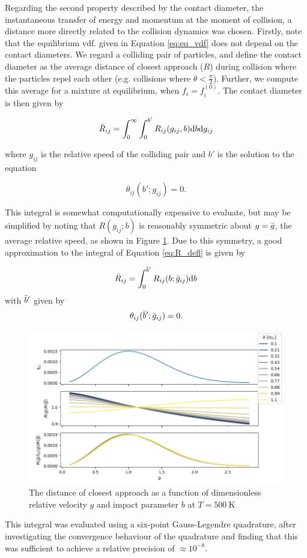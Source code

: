 Regarding the second property described by the contact diameter, the instantaneous transfer of energy and momentum at the moment of collision, a distance more directly related to the collision dynamics was chosen. Firstly, note that the equilibrium vdf. given in Equation \eqref{eq:eq_vdf} does not depend on the contact diameters. We regard a colliding pair of particles, and define the contact diameter as the average distance of closest approach ($R$) during collision where the particles repel each other (e.g. collisions where $\theta < \frac{\pi}{2}$). Further, we compute this average for a mixture at equilibrium, when $f_i = f_i^{(0)}$. The contact diameter is then given by

\begin{equation}
    \Bar{R}_{ij} = \int_{0}^{\infty} \int_0^{b'} R_{ij}(g_{ij}, b) \mathrm{d} b \mathrm{d} g_{ij}
    \label{eq:R_defl}
\end{equation}

where $g_{ij}$ is the relative speed of the colliding pair and $b'$ is the solution to the equation

\begin{equation}
    \theta_{ij}(b'; g_{ij}) = 0.
\end{equation}

This integral is somewhat computationally expensive to evaluate, but may be simplified by noting that $R(g_{ij}; b)$ is reasonably symmetric about $g = \Bar{g}$, the average relative speed, as shown in Figure \ref{fig:symmetry_closest_appr}. Due to this symmetry, a good approximation to the integral of Equation \eqref{eq:R_defl} is given by

\begin{equation}
    \Bar{R}_{ij} = \int_0^{\Bar{b}'} R_{ij}(b; \Bar{g}_{ij}) \mathrm{d} b
\end{equation}
with $\Bar{b}'$ given by
\begin{equation}
    \theta_{ij}(\Bar{b}'; \Bar{g}_{ij}) = 0.
\end{equation}

\begin{figure}[htb]
    \centering
    \includegraphics[width=\textwidth]{symmetry_closest_appr.png}
    \caption{The distance of closest approach as a function of dimensionless relative velocity $g$ and impact parameter $b$ at $T = \SI{500}{\kelvin}$}
    \label{fig:symmetry_closest_appr}
\end{figure}

This integral was evaluated using a six-point Gauss-Legendre quadrature, after investigating the convergence behaviour of the quadrature and finding that this was sufficient to achieve a relative precision of $\approx 10^{-8}$.